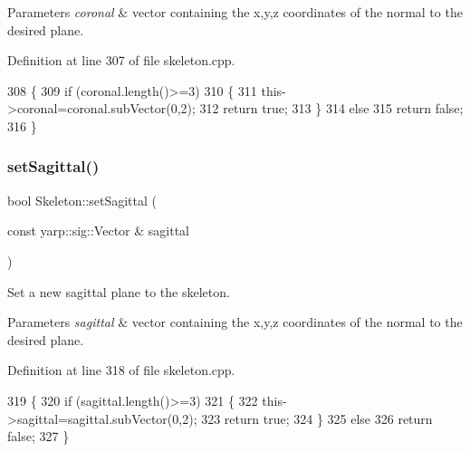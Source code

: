 \begin{DoxyParams}{Parameters}
{\em coronal} & vector containing the x,y,z coordinates of the normal to the desired plane. \\
\hline
\end{DoxyParams}


Definition at line 307 of file skeleton.\+cpp.


\begin{DoxyCode}
308 \{
309     \textcolor{keywordflow}{if} (coronal.length()>=3)
310     \{
311         this->coronal=coronal.subVector(0,2);
312         \textcolor{keywordflow}{return} \textcolor{keyword}{true};
313     \}
314     \textcolor{keywordflow}{else}
315         \textcolor{keywordflow}{return} \textcolor{keyword}{false};
316 \}
\end{DoxyCode}
\mbox{\label{classassistive__rehab_1_1Skeleton_af92fdb0e3eb88a0b1dedd5038e2c6eb7}} 
\subsubsection{\texorpdfstring{set\+Sagittal()}{setSagittal()}}
{\footnotesize\ttfamily bool Skeleton\+::set\+Sagittal (\begin{DoxyParamCaption}\item[{const yarp\+::sig\+::\+Vector \&}]{sagittal }\end{DoxyParamCaption})\hspace{0.3cm}{\ttfamily [inherited]}}



Set a new sagittal plane to the skeleton. 


\begin{DoxyParams}{Parameters}
{\em sagittal} & vector containing the x,y,z coordinates of the normal to the desired plane. \\
\hline
\end{DoxyParams}


Definition at line 318 of file skeleton.\+cpp.


\begin{DoxyCode}
319 \{
320     \textcolor{keywordflow}{if} (sagittal.length()>=3)
321     \{
322         this->sagittal=sagittal.subVector(0,2);
323         \textcolor{keywordflow}{return} \textcolor{keyword}{true};
324     \}
325     \textcolor{keywordflow}{else}
326         \textcolor{keywordflow}{return} \textcolor{keyword}{false};
327 \}
\end{DoxyCode}
\mbox{\label{classassistive__rehab_1_1Skeleton_ae1c830e3d9a0ba692e5ae297caa52a82}} 
